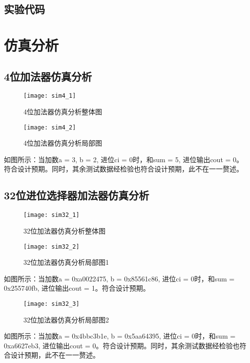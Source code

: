 \documentclass{../source/Experiment}
\begin{document}
\subsection{实验代码}





\section{仿真分析}
\subsection{4位加法器仿真分析}
\begin{figure}[H]
    \centering
    \texttt{[image: sim4\_1]}
    \caption{4位加法器仿真分析整体图}
\end{figure}

\begin{figure}[H]
    \centering
    \texttt{[image: sim4\_2]}
    \caption{4位加法器仿真分析局部图}
\end{figure}
如图所示：当加数a = 3, b = 2, 进位ci = 0时，和sum = 5, 进位输出cout = 0。符合设计预期。同时，其余测试数据经检验也符合设计预期，此不在一一赘述。
\subsection{32位进位选择器加法器仿真分析}
\begin{figure}[H]
    \centering
    \texttt{[image: sim32\_1]}
    \caption{32位加法器仿真分析整体图}
\end{figure}
\begin{figure}[H]
    \centering
    \texttt{[image: sim32\_2]}
    \caption{32位加法器仿真分析局部图1}
\end{figure}
如图所示：当加数a = 0xa0022475, b = 0x85561c86, 进位ci = 0时，和sum = 0x255740fb, 进位输出cout = 1。符合设计预期。
\begin{figure}[H]
    \centering
    \texttt{[image: sim32\_3]}
    \caption{32位加法器仿真分析局部图2}
\end{figure}
如图所示：当加数a = 0x4bbc3b1e, b = 0x5aa64395, 进位ci = 0时，和sum = 0xa6627eb3, 进位输出cout = 0。符合设计预期。同时，其余测试数据经检验也符合设计预期，此不在一一赘述。
\end{document}
